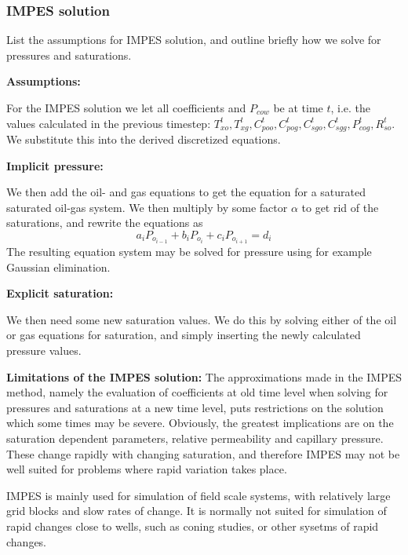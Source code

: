 
\subsubsection{IMPES solution} %
\label{ssub:impes_solution}
\begin{question}
  List the assumptions for IMPES solution, and outline briefly how we solve for pressures and saturations.
\end{question}

\textbf{Assumptions:}

For the IMPES solution we let all coefficients and $P_{cow}$ be at time $t$, i.e. the values calculated in the previous timestep: $T_{xo}^t, T_{xg}^t, C_{poo}^t, C_{pog}^t, C_{sgo}^t, C_{sgg}^t, P_{cog}^t, R_{so}^t$. We substitute this into the derived discretized equations.

\noindent\textbf{Implicit pressure:}

We then add the oil- and gas equations to get the equation for a saturated saturated oil-gas system. We then multiply by some factor $\alpha$ to get rid of the saturations, and rewrite the equations as
\begin{equation}
  a_i P_{o_{i-1}} + b_i P_{o_i} + c_i P_{o_{i+1}} = d_i
\end{equation}
The resulting equation system may be solved for pressure using for example Gaussian elimination.

\noindent\textbf{Explicit saturation:}

We then need some new saturation values. We do this by solving either of the oil or gas equations for saturation, and simply inserting the newly calculated pressure values.

\noindent \textbf{Limitations of the IMPES solution:} The approximations made in the IMPES method, namely the evaluation of coefficients at old time level when solving for pressures and saturations at a new time level, puts restrictions on the solution which some times may be severe. Obviously, the greatest implications are on the saturation dependent parameters, relative permeability and capillary pressure. These change rapidly with changing saturation, and therefore IMPES may not be well suited for problems where rapid variation takes place.

IMPES is mainly used for simulation of field scale systems, with relatively large grid blocks and slow rates of change. It is normally not suited for simulation of rapid changes close to wells, such as coning studies, or other sysetms of rapid changes.


